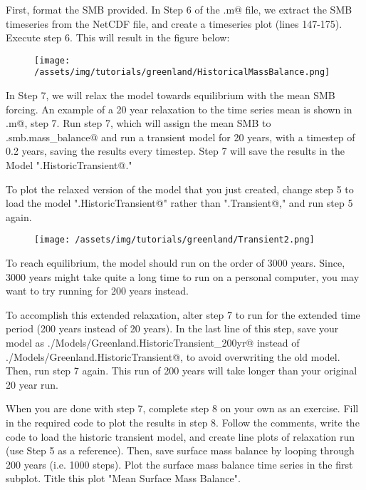 First, format the SMB provided. In Step 6 of the \verb@runme.m@ file, we extract the SMB timeseries from the NetCDF file, and create a timeseries plot (lines 147-175). Execute step 6. This will result in the figure below:
\begin{figure}[H]
	\begin{center}
		\texttt{[image: /assets/img/tutorials/greenland/HistoricalMassBalance.png]}
	\end{center}
\end{figure}

In Step 7, we will relax the model towards equilibrium with the mean SMB forcing. An example of a 20 year relaxation to the time series mean is shown in \verb@runme.m@, step 7. Run step 7, which will assign the mean SMB to \verb@md.smb.mass_balance@ and run a transient model for 20 years, with a timestep of 0.2 years, saving the results every timestep. Step 7 will save the results in the Model "\verb@Greenland.HistoricTransient@."

To plot the relaxed version of the model that you just created, change step 5 to load the model "\verb@Greenland.HistoricTransient@" rather than "\verb@Greenland.Transient@," and run step 5 again.

\begin{figure}[H]
	\begin{center}
		\texttt{[image: /assets/img/tutorials/greenland/Transient2.png]}
	\end{center}
\end{figure}

To reach equilibrium, the model should run on the order of 3000 years. Since, 3000 years might take quite a long time to run on a personal computer, you may want to try running for 200 years instead.

To accomplish this extended relaxation, alter step 7 to run for the extended time period (200 years instead of 20 years). In the last line of this step, save your model as \verb@./Models/Greenland.HistoricTransient_200yr@ instead of \verb@./Models/Greenland.HistoricTransient@, to avoid overwriting the old model. Then, run step 7 again. This run of 200 years will take longer than your original 20 year run.

When you are done with step 7, complete step 8 on your own as an exercise. Fill in the required code to plot the results in step 8. Follow the comments, write the code to load the historic transient model, and create line plots of relaxation run (use Step 5 as a reference). Then, save surface mass balance by looping through 200 years (i.e. 1000 steps). Plot the surface mass balance time series in the first subplot. Title this plot "Mean Surface Mass Balance".

